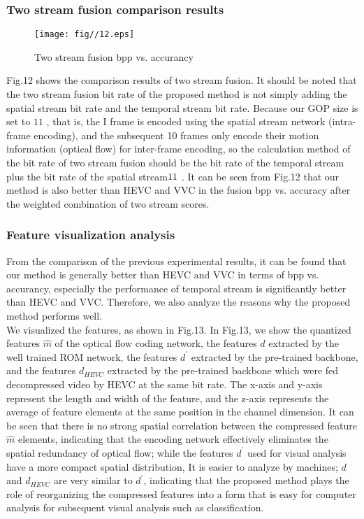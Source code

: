 \documentclass[a4paper]{cas-sc}
\begin{document}
\subsubsection{ Two stream  fusion comparison results}

\begin{figure}[ht]
	\centering
		\texttt{[image: fig//12.eps]}
	  \caption{Two stream fusion bpp vs. accurancy}\label{fig.12}
\end{figure}

Fig.12 shows the comparison results of two stream fusion. 
It should be noted that the two stream fusion bit rate of the proposed method is not simply adding the spatial stream bit rate 
and the temporal stream bit rate. 
Because our GOP size is set to $11$ , that is, the I frame is encoded using the spatial stream network (intra-frame encoding), 
and the subsequent 10 frames only encode their motion information (optical flow) for inter-frame encoding, 
so the calculation method of the bit rate of two stream fusion should be the bit rate of the temporal stream 
plus the bit rate of the spatial stream$\/11$ . 
It can be seen from Fig.12 that our method is also better than HEVC and VVC in the fusion bpp vs. accuracy after 
the weighted combination of two stream scores.\\

\subsubsection{Feature visualization analysis}
From the comparison of the previous experimental results, 
it can be found that our method is generally better than HEVC and VVC in terms of bpp vs. accurancy, 
especially the performance of temporal stream is significantly better than HEVC and VVC. 
Therefore, we also analyze the reasons why the proposed method performs well.\\

We visualized the features, as shown in Fig.13. 
In Fig.13, we show the quantized features $\hat{m}$ of the optical flow coding network, 
the features $d$ extracted by the well trained ROM network, 
the features $d^{'}$ extracted by the pre-trained backbone, 
and the features $d_{HEVC}$ extracted by the pre-trained backbone which were fed decompressed video by HEVC at the same bit rate. 
The x-axis and y-axis represent the length and width of the feature, 
and the z-axis represents the average of feature elements at the same position in the channel dimension. 
It can be seen that there is no strong spatial correlation between the compressed feature $\hat{m}$ elements, 
indicating that the encoding network effectively eliminates the spatial redundancy of optical flow; 
while the features $d^{'}$ used for visual analysis have a more compact spatial distribution, 
It is easier to analyze by machines; 
$d$ and $d_{HEVC}$ are very similar to $d^{'}$, 
indicating that the proposed method plays the role of reorganizing the compressed features into a form 
that is easy for computer analysis for subsequent visual analysis such as classification.\\
\end{document}
